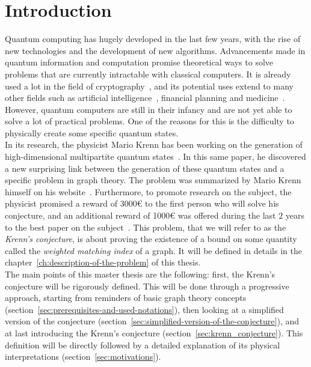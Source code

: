 \setcounter{secnumdepth}{-1}

\chapter{Introduction}
\label{ch:introduction}

Quantum computing has hugely developed in the last few years, with the rise of new technologies and the development of new algorithms.
Advancements made in quantum information and computation promise theoretical ways to solve problems that are currently intractable with classical computers.
It is already used a lot in the field of cryptography~\cite{kumar2021state}, and its potential uses extend to many other fields such as artificial intelligence~\cite{otterbach2017unsupervised}, financial planning and medicine~\cite{hassija2020forthcoming}.
However, quantum computers are still in their infancy and are not yet able to solve a lot of practical problems.
One of the reasons for this is the difficulty to physically create some specific quantum states.\\

In its research, the physicist Mario Krenn has been working on the generation of high-dimensional multipartite quantum states~\cite{Krenn_2017}.
In this same paper, he discovered a new surprising link between the generation of these quantum states and a specific problem in graph theory.
The problem was summarized by Mario Krenn himself on his website~\cite{wordpress}.
Furthermore, to promote research on the subject, the physicist promised a reward of 3000€ to the first person who will solve his conjecture, and an additional reward of 1000€ was offered during the last $2$ years to the best paper on the subject~\cite{wordpress}.
This problem, that we will refer to as the \textit{Krenn's conjecture}, is about proving the existence of a bound on some quantity called the \textit{weighted matching index} of a graph.
It will be defined in details in the chapter~\ref{ch:description-of-the-problem} of this thesis.\\

The main points of this master thesis are the following: first, the Krenn's conjecture will be rigorously defined.
This will be done through a progressive approach, starting from reminders of basic graph theory concepts (section~\ref{sec:prerequisites-and-used-notations}), then looking at a simplified version of the conjecture (section~\ref{sec:simplified-version-of-the-conjecture}), and at last introducing the Krenn's conjecture (section~\ref{sec:krenn_conjecture}).
This definition will be directly followed by a detailed explanation of its physical interpretations (section~\ref{sec:motivations}).\\

